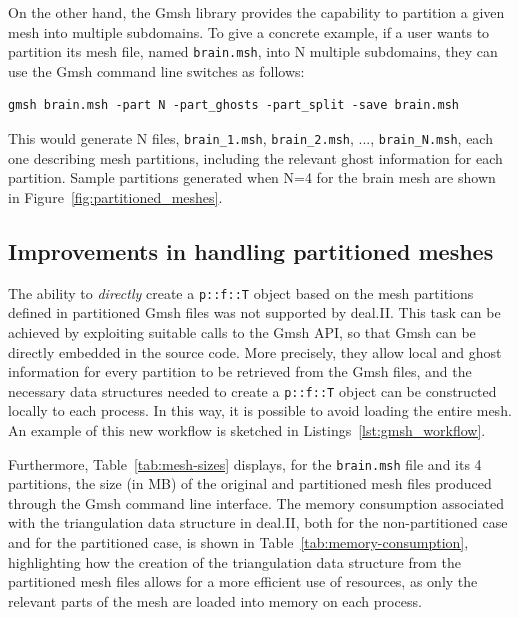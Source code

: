 \documentclass[a4paper,12pt]{article}
\begin{document}
On the other hand, the Gmsh library provides the capability to partition a given mesh
into multiple subdomains. To give a concrete example, if a user
wants to partition its mesh file, named \texttt{brain.msh}, into N multiple subdomains, they can use the Gmsh command line switches as follows:
\begin{lstlisting}[caption=Partitioning a .msh file via command line switches]
gmsh brain.msh -part N -part_ghosts -part_split -save brain.msh
\end{lstlisting}
This would generate N files, \texttt{brain\_1.msh}, \texttt{brain\_2.msh}, ..., \texttt{brain\_{N}.msh}, each one
describing mesh partitions, including the relevant ghost information for each partition. Sample partitions generated
when N=4 for the brain mesh are shown in Figure~\ref{fig:partitioned_meshes}.

\subsection{Improvements in handling partitioned meshes}
The ability to \emph{directly} create a \texttt{p::f::T} object based on the mesh partitions defined in partitioned Gmsh files was not supported
by deal.II. This task can be achieved by exploiting suitable calls to the Gmsh API, so that Gmsh can be directly
embedded in the source code. More precisely, they allow local and ghost information for every partition to be retrieved from
the Gmsh files, and the necessary data structures needed to create a \texttt{p::f::T} object can be constructed locally to each process. In
this way, it is possible to avoid loading the entire mesh. An example of this new workflow is
sketched in Listings~\ref{lst:gmsh_workflow}.

Furthermore, Table~\ref{tab:mesh-sizes} displays, for the \texttt{brain.msh} file and its 4 partitions, the size (in MB) of the original and partitioned mesh files produced through the Gmsh command line
interface. The memory consumption associated with the triangulation data structure in deal.II, both for the non-partitioned case and for
the partitioned case, is shown in Table~\ref{tab:memory-consumption}, highlighting how the creation of the triangulation data
structure from the partitioned mesh files allows for a more efficient use of resources, as only the relevant parts of
the mesh are loaded into memory on each process.
\end{document}
